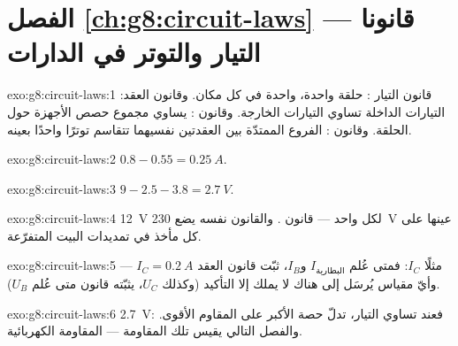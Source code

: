 \section*{الفصل \ref{ch:g8:circuit-laws} --- قانونا التيار والتوتر في الدارات}

\begin{solution}{exo:g8:circuit-laws:1}
قانون التيار : حلقة واحدة،  واحدة في كل مكان.
وقانون العقد: التيارات الداخلة تساوي التيارات الخارجة. وقانون
 :   يساوي مجموع حصص الأجهزة حول
الحلقة. وقانون  : الفروع الممتدّة بين العقدتين
نفسيهما تتقاسم توترًا واحدًا بعينه.
\end{solution}

\begin{solution}{exo:g8:circuit-laws:2}
$0.8 - 0.55 = \qty{0.25}{A}$.
\end{solution}

\begin{solution}{exo:g8:circuit-laws:3}
$9 - 2.5 - 3.8 = \qty{2.7}{V}$.
\end{solution}

\begin{solution}{exo:g8:circuit-laws:4}
\qty{12}{V} لكل واحد --- قانون  . والقانون
نفسه يضع \qty{230}{V} عينها على كل مأخذ في تمديدات البيت
المتفرّعة.
\end{solution}

\begin{solution}{exo:g8:circuit-laws:5}
مثلًا $I_C$: فمتى عُلم $I_{\text{البطارية}}$ و$I_B$، ثبّت قانون
العقد $I_C = \qty{0.2}{A}$ --- وأيّ مقياس يُرسَل إلى هناك لا
يملك إلا التأكيد (وكذلك $U_C$، يثبّته قانون  
متى عُلم $U_B$).
\end{solution}

\begin{solution}{exo:g8:circuit-laws:6}
 \qty{2.7}{V}: فعند تساوي التيار، تدلّ حصة  الأكبر
على المقاوم الأقوى. والفصل التالي يقيس تلك المقاومة ---
المقاومة الكهربائية.
\end{solution}

